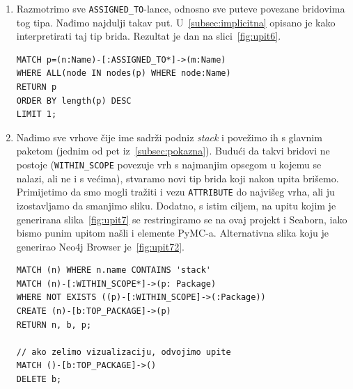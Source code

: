\begin{enumerate}
\item Razmotrimo sve \texttt{ASSIGNED_\-TO}-lance, odnosno sve
puteve povezane bridovima tog tipa. Nađimo najdulji takav put.
U~\ref{subsec:implicitna} opisano je kako interpretirati taj tip brida.
Rezultat je dan na slici~\ref{fig:upit6}.

\begin{lstlisting}
MATCH p=(n:Name)-[:ASSIGNED_TO*]->(m:Name)
WHERE ALL(node IN nodes(p) WHERE node:Name)
RETURN p
ORDER BY length(p) DESC
LIMIT 1;
\end{lstlisting}

\item Nađimo sve vrhove čije ime sadrži podniz \emph{stack} i povežimo
ih s glavnim paketom (jednim od pet iz~\ref{subsec:pokazna}). Budući da
takvi bridovi ne postoje (\texttt{WITHIN_\-SCOPE} povezuje vrh s 
najmanjim opsegom u kojemu se nalazi, ali ne i s većima), stvaramo novi
tip brida koji nakon upita brišemo. Primijetimo da
smo mogli tražiti i vezu \texttt{ATTRIBUTE} do najvišeg vrha,
ali ju izostavljamo da smanjimo sliku. Dodatno, s istim ciljem,
na upitu kojim je generirana slika~\ref{fig:upit7} se restringiramo se na ovaj projekt
i Seaborn, iako bismo punim upitom našli i elemente PyMC-a. Alternativna
slika koju je generirao Neo4j Browser je~\ref{fig:upit72}.

\begin{lstlisting}
MATCH (n) WHERE n.name CONTAINS 'stack'
MATCH (n)-[:WITHIN_SCOPE*]->(p: Package)
WHERE NOT EXISTS ((p)-[:WITHIN_SCOPE]->(:Package))
CREATE (n)-[b:TOP_PACKAGE]->(p)
RETURN n, b, p;

// ako zelimo vizualizaciju, odvojimo upite
MATCH ()-[b:TOP_PACKAGE]->()
DELETE b;
\end{lstlisting}

\end{enumerate}




